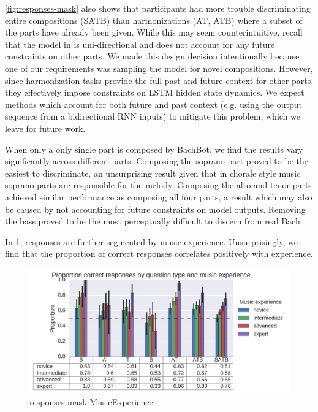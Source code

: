 \cref{fig:responses-mask} also shows that participants had more trouble
discriminating entire compositions (SATB) than harmonizations (AT, ATB) where a
subset of the parts have already been given. While this may seem
counterintuitive, recall that the model in  is uni-directional
and does not account for any future constraints on other parts. We made
this design decision intentionally because one of our requirements was sampling
the model for novel compositions. However, since harmonization tasks provide
the full past and future context for other parts, they effectively impose constraints
on LSTM hidden state dynamics. We expect methods which account for both future and past
context (e.g. using the output sequence from a bidirectional RNN inputs)
to mitigate this problem, which we leave for future work.

When only a only single part is composed by BachBot, we find the results vary significantly
across different parts. Composing the soprano part proved to be the easiest to
discriminate, an unsurprising result given that in chorale style music soprano parts
are responsible for the melody. Composing the alto and tenor parts achieved
similar performance as composing all four parts, a result which may also be caused by
not accounting for future constraints on model outputs. Removing the bass proved
to be the most perceptually difficult to discern from real Bach.

In \cref{fig:responses-mask-musicExperience}, responses are further segmented
by music experience. Unsurprisingly, we find that the proportion of correct responses
correlates positively with experience.

\begin{figure}[htpb]
  \centering
  \includegraphics[width=1.0\textwidth]{responses-mask-musicExperience.png}
  \caption{responses-mask-MusicExperience}
  \label{fig:responses-mask-musicExperience}
\end{figure}

